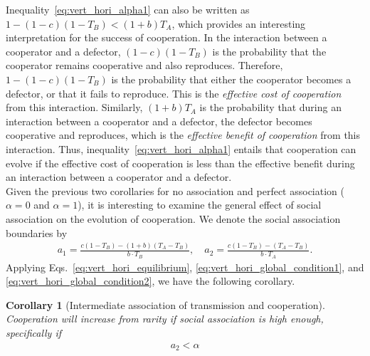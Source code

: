 \documentclass[12pt]{extarticle}
\newtheorem{corollary}{Corollary}
\begin{document}
{%
Inequality~\ref{eq:vert_hori_alpha1} can also be written as
$1 - (1-c)(1-T_B) < (1+b) T_A$,
which provides an interesting interpretation for the success of cooperation. 
In the interaction between a cooperator and a defector, $(1-c)(1-T_B)$ is the probability that the cooperator remains cooperative and also reproduces. 
Therefore, $1 - (1-c)(1-T_B)$ is the probability that either the cooperator becomes a defector, or that it fails to reproduce.
This is the \emph{effective cost of cooperation} from this interaction.
Similarly, $(1+b) T_A$ is the probability that during an interaction between a cooperator and a defector, the defector becomes cooperative and reproduces, which is the \emph{effective benefit of cooperation} from this interaction.
Thus, inequality~\ref{eq:vert_hori_alpha1} entails that cooperation can evolve if the effective cost of cooperation is less than the effective benefit during an interaction between a cooperator and a defector.
\\

Given the previous two corollaries for no association and perfect association ($\alpha=0$ and $\alpha=1$), it is interesting to examine the general effect of social association on the evolution of cooperation.
We denote the social association boundaries by
\begin{equation}\begin{aligned}\label{eq:boundries_assortative_meeting}
  a_1 = \frac{c(1-T_B)-(1+b)(T_A-T_B)}{b\cdot T_B}, \quad
  a_2 = \frac{c(1-T_B)-(T_A-T_B)}{b\cdot T_A}.
\end{aligned}\end{equation}
Applying Eqs.~\ref{eq:vert_hori_equilibrium}, \ref{eq:vert_hori_global_condition1}, and \ref{eq:vert_hori_global_condition2}, we have the following corollary.
\\

\begin{corollary}[Intermediate association of transmission and cooperation]\label{corollary:intermediate_association}
Cooperation will increase from rarity if social association is high enough, specifically if
  \begin{equation} \label{eq:unequal_transmission_from_rarity_in_alpha_terms}
    \begin{aligned}
     a_2 < \alpha
    \end{aligned}
    \end{equation} 
\end{corollary}

}
\end{document}
